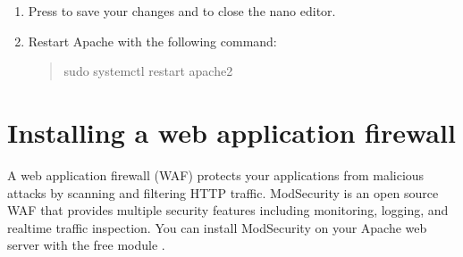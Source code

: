 \documentclass[letterpaper,10pt,english]{sphinxmanual}
\begin{document}
\begin{enumerate}
\item {} 
\sphinxAtStartPar
Press  to save your changes and  to close the nano editor.

\item {} 
\sphinxAtStartPar
Restart Apache with the following command:
\begin{quote}

\begin{sphinxVerbatim}[commandchars=\\\{\}]
\PYGZdl{} sudo systemctl restart apache2
\end{sphinxVerbatim}
\end{quote}

\end{enumerate}


\section{Installing a web application firewall}
\label{\detokenize{hardening-apache:installing-a-web-application-firewall}}
\sphinxAtStartPar
A web application firewall (WAF) protects your applications from malicious attacks by scanning and filtering HTTP traffic. ModSecurity is an open source WAF that provides multiple security features including monitoring, logging, and real\sphinxhyphen{}time traffic inspection. You can install ModSecurity on your Apache web server with the free module .
\end{document}
